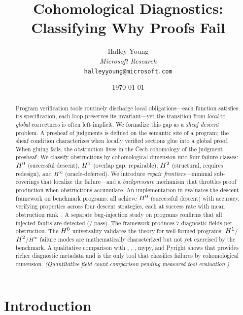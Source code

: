 \documentclass[11pt]{article}
\title{Cohomological Diagnostics: Classifying Why Proofs Fail}
\author{%
  Halley Young\\
  \textit{Microsoft Research}\\
  \texttt{halleyyoung@microsoft.com}
}
\date{\today}
\begin{document}
\maketitle

\begin{abstract}
Program verification tools routinely discharge local obligations---each
function satisfies its specification, each loop preserves its invariant---yet
the transition from \emph{local} to \emph{global} correctness is often left
implicit.  We formalize this gap as a \emph{sheaf descent} problem.  A
presheaf of judgments is defined on the semantic site of a program; the sheaf
condition characterizes when locally verified sections glue into a global
proof.  When gluing fails, the obstruction lives in the \v{C}ech
cohomology of the judgment presheaf.  We classify
obstructions by cohomological dimension into four failure classes:
$H^{0}$ (successful descent),
$H^{1}$ (overlap gap, repairable), $H^{2}$ (structural, requires
redesign), and $H^{\infty}$ (oracle-deferred).  We introduce \emph{repair
frontiers}---minimal sub-coverings that localize the failure---and a
\emph{backpressure} mechanism that throttles proof production when
obstructions accumulate.  An implementation in \JuGeo{} evaluates the
descent framework on \compTotalPrograms{} benchmark programs:
all achieve $H^{0}$ (successful descent) with
\compOverallAccuracy{} accuracy, verifying \compPropsSum{} properties
across four descent strategies, each at \compDescentEagerRate{} success
rate with mean obstruction rank~\compDescentEagerMeanRank{}.
A separate bug-injection study on \compBuggyCount{} programs confirms
that all injected faults are detected (\compBuggyFullPass{}/\compBuggyCount{} pass).
The framework produces 7 diagnostic fields per obstruction.
The $H^{0}$ universality validates the theory for well-formed programs;
$H^{1}$/$H^{2}$/$H^{\infty}$ failure modes are mathematically
characterized but not yet exercised by the benchmark.
A qualitative comparison with \LEAN{}, \Fstar{},
\Dafny{}, mypy, and Pyright shows that \JuGeo{} provides richer
diagnostic metadata and is the only tool that classifies
failures by cohomological dimension.
\emph{(Quantitative field-count comparison pending measured tool evaluation.)}
\end{abstract}

\newpage

\section{Introduction}\label{sec:intro}
\end{document}
